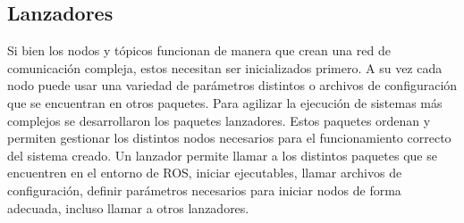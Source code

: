 










\subsection{Lanzadores}

Si bien los nodos y tópicos funcionan de manera que crean una red de
comunicación compleja, estos necesitan ser inicializados primero. A su vez cada
nodo puede usar una variedad de parámetros distintos o archivos de
configuración que se encuentran en otros paquetes. Para agilizar la ejecución
de sistemas más complejos se desarrollaron los paquetes lanzadores. Estos
paquetes ordenan y permiten gestionar los distintos nodos necesarios para el
funcionamiento correcto del sistema creado. Un lanzador permite llamar a los
distintos paquetes que se encuentren en el entorno de ROS, iniciar ejecutables,
llamar archivos de configuración, definir parámetros necesarios para iniciar
nodos de forma adecuada, incluso llamar a otros lanzadores.

